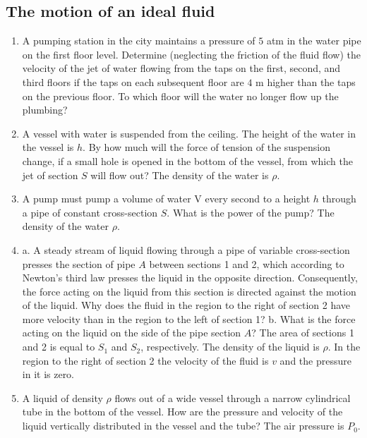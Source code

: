 \documentclass{article}
\begin{document}
\subsection{The motion of an ideal fluid}

\begin{enumerate}[label=4.3.\arabic*]


\item A pumping station in the city maintains a pressure of $5$ atm in the water pipe on the first floor level. Determine (neglecting the friction of the fluid flow) the velocity of the jet of water flowing from the taps on the first, second, and third floors if the taps on each subsequent floor are $4$ m higher than the taps on the previous floor. To which floor will the water no longer flow up the plumbing?

\item A vessel with water is suspended from the ceiling. The height of the water in the vessel is $h$. By how much will the force of tension of the suspension change, if a small hole is opened in the bottom of the vessel, from which the jet of section $S$ will flow out? The density of the water is $\rho$.

\item A pump must pump a volume of water V every second to a height $h$ through a pipe of constant cross-section $S$. What is the power of the pump? The density of the water $\rho$.  

\item a. A steady stream of liquid flowing through a pipe of variable cross-section presses the section of pipe $A$ between sections 1 and 2, which according to Newton's third law presses the liquid in the opposite direction. Consequently, the force acting on the liquid from this section is directed against the motion of the liquid. Why does the fluid in the region to the right of section 2 have more velocity than in the region to the left of section 1? 
b. What is the force acting on the liquid on the side of the pipe section $A$? The area of sections 1 and 2 is equal to $S_1$ and $S_2$, respectively. The density of the liquid is $\rho$. In the region to the right of section 2 the velocity of the fluid is $v$ and the pressure in it is zero. 

\item A liquid of density $\rho$ flows out of a wide vessel through a narrow cylindrical tube in the bottom of the vessel. How are the pressure and velocity of the liquid vertically distributed in the vessel and the tube? The air pressure is $P_0$. 


\end{enumerate}
\end{document}
